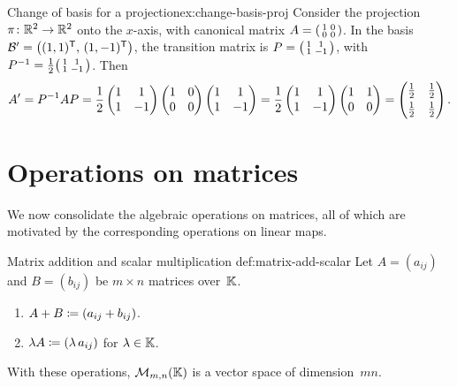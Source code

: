 \begin{example}{Change of basis for a projection}{ex:change-basis-proj}
Consider the projection $\pi\colon{\mathbb{R}}^2\to{\mathbb{R}}^2$ onto the $x$-axis,
with canonical matrix $A = \begin{psmallmatrix}1&0\\0&0\end{psmallmatrix}$.
In the basis ${\mathcal{B}}' = \bigl((1,1)^{\mathsf{T}},\,(1,-1)^{\mathsf{T}}\bigr)$,
the transition matrix is
$P = \begin{psmallmatrix}1&1\\1&-1\end{psmallmatrix}$, with
${P}^{-1} = \tfrac{1}{2}\begin{psmallmatrix}1&1\\1&-1\end{psmallmatrix}$.
Then
\[
  A' = {P}^{-1}AP
  = \frac{1}{2}\begin{pmatrix}1&1\\1&-1\end{pmatrix}
    \begin{pmatrix}1&0\\0&0\end{pmatrix}
    \begin{pmatrix}1&1\\1&-1\end{pmatrix}
  = \frac{1}{2}\begin{pmatrix}1&1\\1&-1\end{pmatrix}
    \begin{pmatrix}1&1\\0&0\end{pmatrix}
  = \begin{pmatrix}\tfrac{1}{2}&\tfrac{1}{2}\\[3pt]
    \tfrac{1}{2}&\tfrac{1}{2}\end{pmatrix}.
\]
\end{example}


\section{Operations on matrices}\label{sec:matrix-operations}

We now consolidate the algebraic operations on matrices, all of which
are motivated by the corresponding operations on linear maps.

\begin{definition}{Matrix addition and scalar multiplication}%
{def:matrix-add-scalar}
Let $A = (a_{ij})$ and $B = (b_{ij})$ be $m\times n$ matrices over~${\mathbb{K}}$.
\begin{enumerate}[label=(\roman*)]
  \item $A + B \coloneqq (a_{ij}+b_{ij})$.
  \item $\lambda A \coloneqq (\lambda\,a_{ij})$ for $\lambda\in{\mathbb{K}}$.
\end{enumerate}
With these operations, $\mathcal{M}_{m,n}({\mathbb{K}})$ is a vector space of
dimension~$mn$.
\end{definition}

